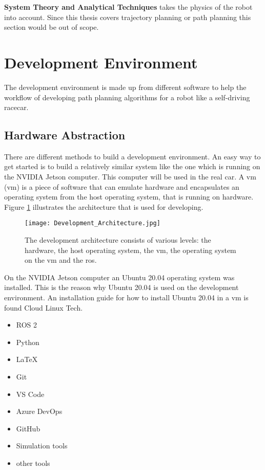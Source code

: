 \textbf{System Theory and Analytical Techniques} takes the physics of the robot into account. Since this thesis covers trajectory planning or path planning this section would be out of scope. \cite{planning_algorithms_steven_m_lavalle}

\section{Development Environment}

The development environment is made up from different software to help the workflow of developing path planning algorithms for a robot like a self-driving racecar.

\subsection{Hardware Abstraction}

There are different methods to build a development environment. An easy way to get started is to build a relatively similar system like the one which is running on the NVIDIA Jetson computer. This computer will be used in the real car. A \acrlong{vm} (\acrshort{vm}) is a piece of software that can emulate hardware and encapsulates an operating system from the host operating system, that is running on hardware. Figure \ref{fig:Development Architecture} illustrates the architecture that is used for developing. 

\begin{figure}[H]
    \centering
    \texttt{[image: Development\_Architecture.jpg]}
    \caption{The development architecture consists of various levels: the hardware, the host operating system, the \acrlong{vm}, the operating system on the \acrshort{vm} and the \acrlong{ros}.}
    \label{fig:Development Architecture}
\end{figure}

On the NVIDIA Jetson computer an Ubuntu 20.04 operating system was installed. This is the reason why Ubuntu 20.04 is used on the development environment. An installation guide for how to install Ubuntu 20.04 in a \acrlong{vm} is found Cloud Linux Tech. \cite{cloudlinuxtech_install_ubuntu_2004}

\begin{itemize}
    \item ROS 2
    \item Python
    \item LaTeX
    \item Git
    \item VS Code
    \item Azure DevOps
    \item GitHub
    \item Simulation tools
    \item other tools
\end{itemize}

